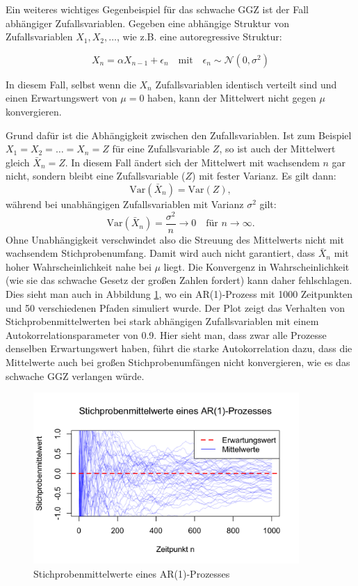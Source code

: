 \documentclass[aodsor,preprint]{imsart}
\numberwithin{equation}{section}
\theoremstyle{plain}
\begin{document}
Ein weiteres wichtiges Gegenbeispiel für das schwache GGZ ist der Fall abhängiger Zufallsvariablen.
Gegeben eine abhängige Struktur von Zufallsvariablen \(X_1, X_2, \dots\), wie z.B. eine autoregressive Struktur:

\[
X_n = \alpha X_{n-1} + \epsilon_n \quad \text{mit} \quad \epsilon_n \sim \mathcal{N}(0, \sigma^2)
\]

In diesem Fall, selbst wenn die \(X_n\) Zufallsvariablen identisch verteilt sind und einen Erwartungswert von \(\mu = 0\) haben, kann der Mittelwert nicht gegen \(\mu\) konvergieren.

Grund dafür ist die Abhängigkeit zwischen den Zufallsvariablen. Ist zum Beispiel \(X_1 = X_2 = \dots = X_n = Z\) für eine Zufallsvariable \(Z\), so ist auch der Mittelwert gleich \(\bar{X}_n = Z\). In diesem Fall ändert sich der Mittelwert mit wachsendem \(n\) gar nicht, sondern bleibt eine Zufallsvariable (\(Z\)) mit fester Varianz. Es gilt dann:
\[
\text{Var}(\bar{X}_n) = \text{Var}(Z),
\]
während bei unabhängigen Zufallsvariablen mit Varianz \(\sigma^2\) gilt:
\[
\text{Var}(\bar{X}_n) = \frac{\sigma^2}{n} \to 0 \quad \text{für } n \to \infty.
\]
Ohne Unabhängigkeit verschwindet also die Streuung des Mittelwerts nicht mit wachsendem Stichprobenumfang.
Damit wird auch nicht garantiert, dass \(\bar{X}_n\) mit hoher Wahrscheinlichkeit nahe bei \(\mu\) liegt.
Die Konvergenz in Wahrscheinlichkeit (wie sie das schwache Gesetz der großen Zahlen fordert) kann daher fehlschlagen.
Dies sieht man auch in Abbildung \ref{fig:ar1}, wo ein AR(1)-Prozess mit 1000 Zeitpunkten und 50 verschiedenen Pfaden simuliert wurde.
Der Plot zeigt das Verhalten von Stichprobenmittelwerten bei stark abhängigen Zufallsvariablen mit einem Autokorrelationsparameter von 0.9.
Hier sieht man, dass zwar alle Prozesse denselben Erwartungswert haben, führt die starke Autokorrelation dazu, dass die Mittelwerte auch bei großen Stichprobenumfängen nicht konvergieren, wie es das schwache GGZ verlangen würde.


\begin{figure}[h!]
  \centering
  \includegraphics[width=0.9\textwidth]{ar1.png}
  \caption{Stichprobenmittelwerte eines AR(1)-Prozesses}
  \label{fig:ar1}
\end{figure}
\end{document}
